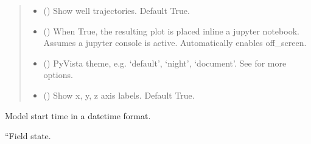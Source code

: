 \documentclass[letterpaper,10pt,english]{sphinxmanual}
\begin{document}
\begin{fulllineitems}
\begin{fulllineitems}
\begin{quote}
\begin{description}
\begin{itemize}
\item {} 
 () \textendash{} Show well trajectories. Default True.

\item {} 
 () \textendash{} When True, the resulting plot is placed inline a jupyter notebook.
Assumes a jupyter console is active. Automatically enables off\_screen.

\item {} 
 () \textendash{} PyVista theme, e.g. ‘default’, ‘night’, ‘document’.
See  for more options.

\item {} 
 () \textendash{} Show x, y, z axis labels. Default True.

\end{itemize}

\end{description}\end{quote}

\end{fulllineitems}


\begin{fulllineitems}
\label{\detokenize{api/field:geology.src.Field.start}}
Model start time in a datetime format.

\end{fulllineitems}


\begin{fulllineitems}
\label{\detokenize{api/field:geology.src.Field.state}}
“Field state.


\end{fulllineitems}
\end{fulllineitems}
\end{document}
